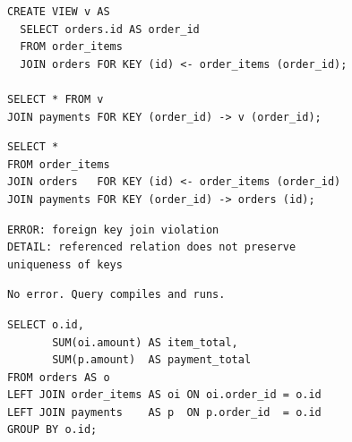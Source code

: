 \documentclass[12pt]{article}
\newcommand{\FanoutCheckHeight}[3]{%
  \ifdim\dimexpr\ht#1+\dp#1\relax>#2\relax
    \PackageError{fanout-layout}{#3 exceeds its vertical allocation}%
      {Adjust the terminal line spacing or the box position.}%
  \fi
}
\begin{document}
\begin{lrbox}{\composabilityView}\begin{minipage}{158mm}
\begin{lstlisting}[style=composability-sql]
CREATE VIEW v AS
  SELECT orders.id AS order_id
  FROM order_items
  JOIN orders FOR KEY (id) <- order_items (order_id);

SELECT * FROM v
JOIN payments FOR KEY (order_id) -> v (order_id);
\end{lstlisting}
\end{minipage}\end{lrbox}
\begin{lrbox}{\composabilityInline}\begin{minipage}{158mm}
\begin{lstlisting}[style=composability-sql]
SELECT *
FROM order_items
JOIN orders   FOR KEY (id) <- order_items (order_id)
JOIN payments FOR KEY (order_id) -> orders (id);
\end{lstlisting}
\end{minipage}\end{lrbox}
\begin{lrbox}{\composabilityError}\begin{minipage}{158mm}
\begin{lstlisting}[style=composability-message]
ERROR: foreign key join violation
DETAIL: referenced relation does not preserve
uniqueness of keys
\end{lstlisting}
\end{minipage}\end{lrbox}
\begin{lrbox}{\composabilityAccepted}\begin{minipage}{158mm}
\begin{lstlisting}[style=composability-message]
No error. Query compiles and runs.
\end{lstlisting}
\end{minipage}\end{lrbox}
\FanoutCheckHeight{\composabilityView}{56mm}{Composability view SQL}
\FanoutCheckHeight{\composabilityInline}{33mm}{Composability inline SQL}
\FanoutCheckHeight{\composabilityError}{22mm}{Composability error message}

\begin{lrbox}{\openingFanout}\begin{minipage}{344mm}
\begin{lstlisting}[style=teaser-sql]
SELECT o.id,
       SUM(oi.amount) AS item_total,
       SUM(p.amount)  AS payment_total
FROM orders AS o
LEFT JOIN order_items AS oi ON oi.order_id = o.id
LEFT JOIN payments    AS p  ON p.order_id  = o.id
GROUP BY o.id;
\end{lstlisting}
\end{minipage}\end{lrbox}
\end{document}
